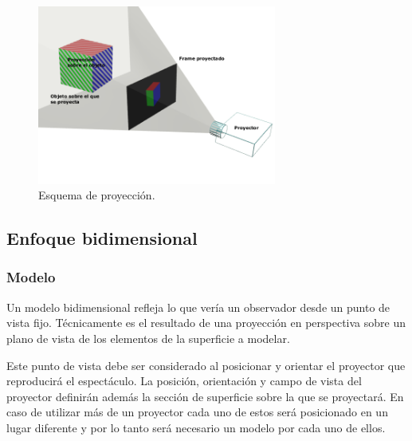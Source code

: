 
\begin{figure}[H]
  \centering
    \includegraphics[width=0.7\textwidth]{./Cap2_videomapping/proy2dvs3d}
  \caption{Esquema de proyección.}%
  \label{fig:proy2dvs3d}
\end{figure}

\subsection{Enfoque bidimensional}
\subsubsection{Modelo}
Un modelo bidimensional refleja lo que vería un observador desde un punto de vista fijo.
Técnicamente es el resultado de una proyección en perspectiva \cite{LibroCompGrafica} sobre un plano de vista de los elementos de la superficie a modelar.

Este punto de vista debe ser considerado al posicionar y orientar el proyector que reproducirá el espectáculo.
La posición, orientación y campo de vista del proyector definirán además la sección de superficie sobre la que se proyectará.
En caso de utilizar más de un proyector cada uno de estos será posicionado en un lugar diferente y por lo tanto será necesario un modelo por cada uno de ellos.

